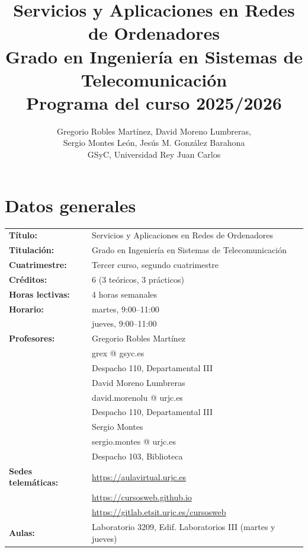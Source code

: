 \documentclass[a4paper,12pt]{article}
\title{Servicios y Aplicaciones en Redes de Ordenadores \\
Grado en Ingeniería en Sistemas de Telecomunicación \\
Programa del curso 2025/2026}
\author{Gregorio Robles Martínez,  David Moreno Lumbreras, \\
Sergio Montes León, Jesús M. González Barahona \\
GSyC, Universidad Rey Juan Carlos}
\begin{document}
\maketitle

\tableofcontents

\newpage

\section{Datos generales}

\begin{tabular}{ll}
\textbf{Título:} & Servicios y Aplicaciones en Redes de Ordenadores  \\
\textbf{Titulación:} & Grado en Ingeniería en Sistemas de Telecomunicación \\
\textbf{Cuatrimestre:} & Tercer curso, segundo cuatrimestre \\
\textbf{Créditos:} & 6 (3 teóricos, 3 prácticos) \\
\textbf{Horas lectivas:} & 4 horas semanales \\
\textbf{Horario:} & martes, 9:00--11:00 \\
                  & jueves, 9:00--11:00 \\
\textbf{Profesores:}
& Gregorio Robles Martínez\\
& \hspace{1cm}grex @ gsyc.es \\
& \hspace{1cm}Despacho 110, Departamental III\\
& David Moreno Lumbreras \\
& \hspace{1cm}david.morenolu @ urjc.es \\
& \hspace{1cm}Despacho 110, Departamental III\\
& Sergio Montes\\
& \hspace{1cm}sergio.montes @ urjc.es \\
& \hspace{1cm}Despacho 103, Biblioteca\\
\textbf{Sedes telemáticas:} & \url{https://aulavirtual.urjc.es} \\
                            & \url{https://cursosweb.github.io} \\
                            & \url{https://gitlab.etsit.urjc.es/cursosweb} \\
\textbf{Aulas:} & Laboratorio 3209, Edif. Laboratorios III (martes y jueves) \\
\end{tabular}
\end{document}
